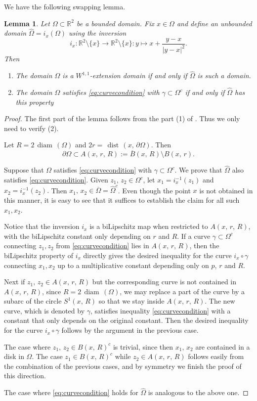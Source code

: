 \documentclass[reqno,11pt]{amsart}
\makeatletter
\def\dist{{\mathop\mathrm{\,dist\,}}}
\def\diam{{\mathop\mathrm{\,diam\,}}}
\newtheorem{lem}[thm]{Lemma}%
\numberwithin{equation}{section}
\theoremstyle{remark}
\makeatother
\begin{document}
We have the following swapping lemma. 
\begin{lem}\label{lma:unboundedbounded}
 Let $\Omega \subset \mathbb R^2$ be a bounded domain. 
Fix $x \in \Omega$ and define
 an unbounded domain $\hat \Omega = i_x(\Omega)$ using the inversion 
 \[
  i_x \colon \mathbb R^2\setminus\{x\} \to \mathbb R^2\setminus\{x\} \colon y \mapsto x + \frac{y-x}{|y-x|^2}.
 \]
 Then
 \begin{enumerate}
  \item The domain $\Omega$ is a $W^{1,1}$-extension domain 
        if and only if $\hat \Omega$ is such a domain.
  \item The domain $\Omega$ satisfies \eqref{eq:curvecondition} with $\gamma\subset \Omega^c$ if and only if 
$\hat \Omega$ has this property 
 \end{enumerate}
\end{lem}
\begin{proof}
The first part of the lemma follows from the part (1) of \cite[Lemma 5.1]{KRZ2015}. Thus we only need to verify (2).

Let  $R=2\diam(\Omega)$ and $2r= \dist(x,\,\partial \Omega) $. Then 
$$\partial \Omega \subset A(x,\,r,\,R) := \overline B(x,\,R) \setminus {B(x,\,r)}.$$ 

Suppose that $\Omega$ satisfies \eqref{eq:curvecondition} with $\gamma\subset \Omega^c.$ We prove that $\hat \Omega$ also satisfies \eqref{eq:curvecondition}. Given $z_1,\,z_2\in \Omega^c$,  let $x_1=i_x^{-1}(z_1)$ and $x_2=i_x^{-1}(z_2).$ Then $x_1,\,x_2\in \overline {\Omega}=\hat \Omega^c$. Even though the point $x$ is not obtained in this manner, it is easy to see that it suffices to establish the claim for all such $x_1,x_2.$

Notice that the inversion $i_x$ is a biLipschitz map when restricted to $A(x,\,r,\,R)$, with the biLipschitz constant only depending on $r$ and $R$. 
If a curve $\gamma\subset \Omega^c$ connecting $z_1,z_2$  from   \eqref{eq:curvecondition} lies in $A(x,\,r,\,R)$, then the biLipschitz property of $i_x$ directly gives the desired inequality for the curve $i_x \circ\gamma$  connecting $x_1,x_2$ up to a multiplicative constant depending only on $p$, $r$ and $R$. 


Next if $z_1,\,z_2\in A(x,\,r,\,R)$ but the corresponding curve is not contained in  $A(x,\,r,\,R)$, since $R= 2\diam( \Omega)$, we may replace a part of the curve by a subarc of the circle $S^1(x,\,R)$ so that we stay inside $A(x,\,r,\,R)$. The new curve, which is denoted by $\gamma$, satisfies inequality 
\eqref{eq:curvecondition} with a constant that only depends on the original
constant.  Then the desired inequality for the curve $i_x \circ\gamma$ follows by the argument in the previous case. 

The case where $z_1,\,z_2\in B(x,\,R)^c$ is trivial, since then $x_1,\, x_2$ are contained in a disk in $\Omega.$  The case $z_1\in B(x,\,R)^c$ while $z_2\in A(x,\,r,\,R)$ follows easily from the combination of  the previous cases, and by symmetry we finish the proof of this direction. 

The case where \eqref{eq:curvecondition}  holds for $\hat \Omega$ is analogous to the above one.
\end{proof}
 
\end{document}
